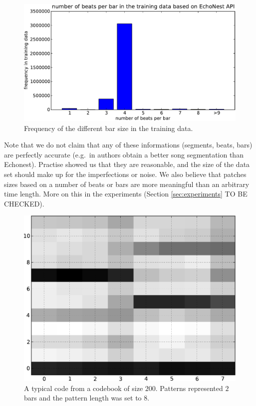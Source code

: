 \documentclass{article}
\newcommand{\eg}{e.g.~}
\begin{document}
\begin{figure}[htb]
\begin{center}
\includegraphics[width=.9\columnwidth]{bar_size_freq}
\end{center}
\caption{\small{
Frequency of the different bar size in the training data.
}}
\label{fig:barsize}
\end{figure}

Note that we do not claim that any of these informations (segments, beats, bars)
are perfectly accurate (\eg in \cite{Barrington2009a} authors obtain a better
song segmentation than Echonest). Practise showed us that they are reasonable, 
and the size of the data set should make up for the imperfections or noise.
We also believe that patches sizes based on a number of beats or bars are more
meaningful than an arbitrary time length. More on this in the experiments
(Section \ref{sec:experiments} TO BE CHECKED).

\begin{figure}[htb]
\begin{center}
\includegraphics[width=.6\columnwidth]{code}
\end{center}
\caption{\small{A typical code from a codebook of size $200$. 
Patterns represented
$2$ bars and the pattern length was set to $8$.
}}
\label{fig:code}
\end{figure}
\end{document}

